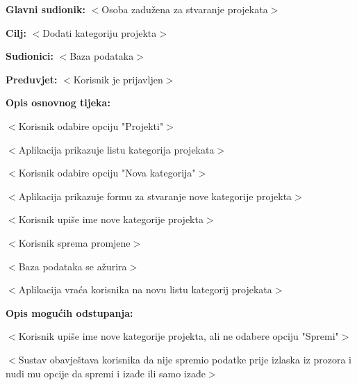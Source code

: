					\noindent {}
					\begin{packed_item}

						\item \textbf{Glavni sudionik: }$<$Osoba zadužena za stvaranje projekata$>$
						\item  \textbf{Cilj:} $<$Dodati kategoriju projekta$>$
						\item  \textbf{Sudionici:} $<$Baza podataka$>$
						\item  \textbf{Preduvjet:} $<$Korisnik je prijavljen$>$
						\item  \textbf{Opis osnovnog tijeka:}

						\item[] \begin{packed_enum}

							\item $<$Korisnik odabire opciju "Projekti"$>$
							\item $<$Aplikacija prikazuje listu kategorija projekata$>$
							\item $<$Korisnik odabire opciju "Nova kategorija"$>$
							\item $<$Aplikacija prikazuje formu za stvaranje nove kategorije projekta$>$
							\item $<$Korisnik upiše ime nove kategorije projekta$>$
							\item $<$Korisnik sprema promjene$>$
							\item $<$Baza podataka se ažurira$>$
							\item $<$Aplikacija vraća korisnika na novu listu kategorij projekata$>$
						\end{packed_enum}

						\item  \textbf{Opis mogućih odstupanja:}

						\item[] \begin{packed_item}

							\item[5.a] $<$Korisnik upiše ime nove kategorije projekta, ali ne odabere opciju "Spremi"$>$
							\item[] \begin{packed_enum}

								\item $<$Sustav obavještava korisnika da nije spremio podatke prije izlaska
								iz prozora i nudi mu opcije da spremi i izađe ili samo izađe$>$


\end{packed_enum}
\end{packed_item}
\end{packed_item}
